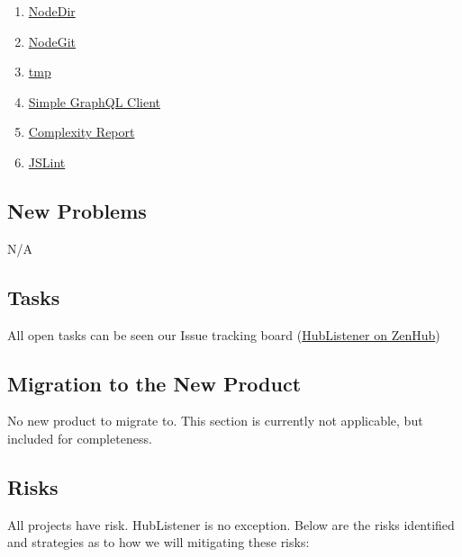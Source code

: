 \documentclass{article}
\begin{document}
\begin{enumerate}

\item  \href{https://www.npmjs.com/package/node-dir}{NodeDir} 
\item  \href{https://www.npmjs.com/package/nodegit}{NodeGit}
\item  \href{https://www.npmjs.com/package/tmp}{tmp} 
\item  \href{https://www.npmjs.com/package/graphql-client}{Simple GraphQL Client} 
\item  \href{https://www.npmjs.com/package/complexity-report#complexity-metrics}{Complexity Report} 
\item \href{https://www.npmjs.com/package/jslint}{JSLint}

\end{enumerate}
\subsection{New Problems}

N/A

\subsection{Tasks}
All open tasks can be seen our Issue tracking board (\href{ https://app.zenhub.com/workspaces/hublistener-5bad6c4d4b5806bc2bea488f/boards?repos=150634456}{HubListener on ZenHub})
\subsection{Migration to the New Product}

No new product to migrate to. This section is currently not applicable, but included for completeness. 
\subsection{Risks}

All projects have risk. HubListener is no exception. Below are the risks identified and strategies as to how we will mitigating these risks:
\end{document}
